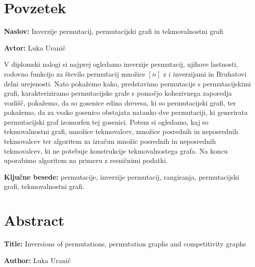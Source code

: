 \documentclass[a4paper, 12pt]{book}
\newcommand{\ttitle}{Inverzije permutacij, permutacijski grafi in tekmovalnostni grafi}
\newcommand{\ttitleEn}{Inversions of permutations, permutation graphs and competitivity graphs}
\newcommand{\tauthor}{Luka Uranič}
\newcommand{\tkeywords}{permutacije, inverzije permutacij, rangiranja, permutacijski grafi, tekmovalnostni grafi}
\newcommand{\clearemptydoublepage}{\newpage{\pagestyle{empty}\cleardoublepage}}
\begin{document}

\chapter*{Povzetek}

\noindent\textbf{Naslov:} \ttitle
\bigskip

\noindent\textbf{Avtor:} \tauthor
\bigskip

\noindent V diplomski nalogi si najprej ogledamo inverzije permutacij, njihove lastnosti, rodovno funkcijo za število permutacij množice $[n]$ z $i$ inverzijami in Bruhatovi delni urejenosti.
Nato pokažemo kako, predstavimo permutacije s permutacijskimi grafi, karakteriziramo permutacijske grafe s pomočjo kohezivnega zaporedja vozlišč, pokažemo, da so gosenice edina drevesa, ki so permutacijski grafi, ter pokažemo, da za vsako gosenico obstajata natanko dve permutaciji, ki generirata permutacijski graf izomorfen tej gosenici. Potem si ogledamo, kaj so tekmovalnostni grafi, množice tekmovalcev, množice posrednih in neposrednih tekmovalcev ter algoritem za izračun množic posrednih in neposrednih tekmovalcev, ki ne potebuje konstrukcije tekmovalnostega grafa. Na koncu uporabimo algoritem na primeru z resničnimi podatki.


\bigskip

\noindent\textbf{Ključne besede:} \tkeywords.
\clearemptydoublepage

\chapter*{Abstract}

\noindent\textbf{Title:} \ttitleEn
\bigskip

\noindent\textbf{Author:} \tauthor
\bigskip
\end{document}

